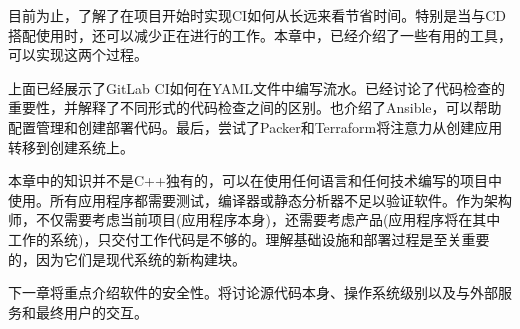 目前为止，了解了在项目开始时实现CI如何从长远来看节省时间。特别是当与CD搭配使用时，还可以减少正在进行的工作。本章中，已经介绍了一些有用的工具，可以实现这两个过程。

上面已经展示了GitLab CI如何在YAML文件中编写流水。已经讨论了代码检查的重要性，并解释了不同形式的代码检查之间的区别。也介绍了Ansible，可以帮助配置管理和创建部署代码。最后，尝试了Packer和Terraform将注意力从创建应用转移到创建系统上。

本章中的知识并不是C++独有的，可以在使用任何语言和任何技术编写的项目中使用。所有应用程序都需要测试，编译器或静态分析器不足以验证软件。作为架构师，不仅需要考虑当前项目(应用程序本身)，还需要考虑产品(应用程序将在其中工作的系统)，只交付工作代码是不够的。理解基础设施和部署过程是至关重要的，因为它们是现代系统的新构建块。

下一章将重点介绍软件的安全性。将讨论源代码本身、操作系统级别以及与外部服务和最终用户的交互。